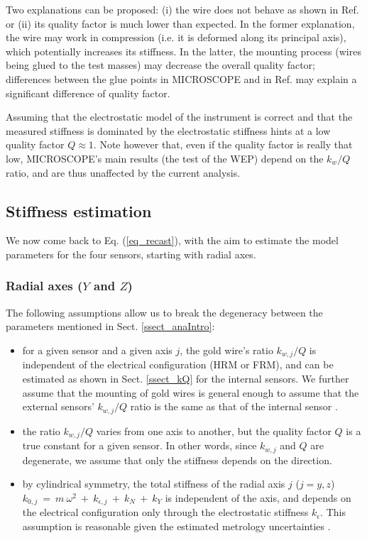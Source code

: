 \documentclass[12pt]{iopart}
\begin{document}
Two explanations can be proposed: (i) the wire does not behave as shown in Ref. \cite{willemenot00} or (ii) its quality factor is much lower than expected. 
In the former explanation, the wire may work in compression (i.e. it is deformed along its principal axis), which potentially increases its stiffness. In the latter, the mounting process (wires being glued to the test masses) may decrease the overall quality factor; differences between the glue points in MICROSCOPE and in Ref. \cite{willemenot00} may explain a significant difference of quality factor.


Assuming that the electrostatic model of the instrument is correct and that the measured stiffness is dominated by the electrostatic stiffness hints at a low quality factor $Q\approx 1$. 
Note however that, even if the quality factor is really that low, MICROSCOPE's main results (the test of the WEP) depend on the $k_w/Q$ ratio, and are thus unaffected by the current analysis.


\subsection{Stiffness estimation}  \label{ssect_kestimation}

We now come back to Eq. (\ref{eq_recast}), with the aim to estimate the model parameters for the four sensors, starting with radial axes. 

\subsubsection{Radial axes ($Y$ and $Z$)}

The following assumptions allow us to break the degeneracy between the parameters mentioned in Sect. \ref{ssect_anaIntro}:
\begin{itemize}
\item for a given sensor and a given axis $j$, the gold wire's ratio $k_{w,j}/Q$ is independent of the electrical configuration (HRM or FRM), and can be estimated as shown in Sect. \ref{ssect_kQ} for the internal sensors. We further assume that the mounting of gold wires is general enough to assume that the external sensors' $k_{w,j}/Q$ ratio is the same as that of the internal sensor \cite{liorzou20}.
\item the ratio $k_{w,j}/Q$ varies from one axis to another, but the quality factor $Q$ is a true constant for a given sensor. In other words, since $k_{w,j}$ and $Q$ are degenerate, we assume that only the stiffness depends on the direction.
\item by cylindrical symmetry, the total stiffness of the radial axis $j$ ($j=y,z$) $k_{0,j} ~= ~m ~\omega^2 ~+ ~k_{\epsilon,j} ~+ ~k_N ~+ ~k_Y$ is independent of the axis, and depends on the electrical configuration only through the electrostatic stiffness $k_\epsilon$. This assumption is reasonable given the estimated metrology uncertainties \cite{liorzou20}.
\end{itemize}
\end{document}
